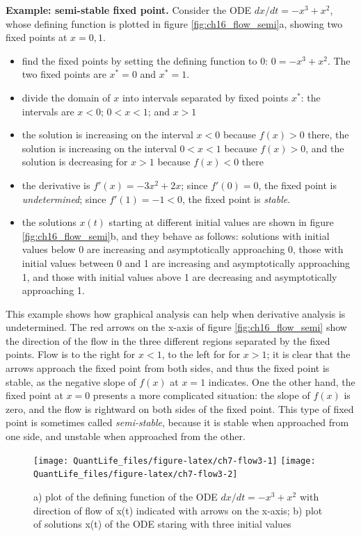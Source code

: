 \documentclass[
]{book}
\theoremstyle{definition}
\theoremstyle{definition}
\theoremstyle{definition}
\theoremstyle{remark}
\begin{document}
\textbf{Example: semi-stable fixed point.} Consider the ODE \(dx/dt = -x^3 + x^2\), whose defining function is plotted in figure \ref{fig:ch16_flow_semi}a, showing two fixed points at \(x = 0, 1\).

\begin{itemize}
\item
  find the fixed points by setting the defining function to 0: \(0 = -x^3 + x^2\). The two fixed points are \(x^*=0\) and \(x^*=1\).
\item
  divide the domain of \(x\) into intervals separated by fixed points \(x^*\): the intervals are \(x<0\); \(0<x<1\); and \(x>1\)
\item
  the solution is increasing on the interval \(x<0\) because \(f(x)>0\) there, the solution is increasing on the interval \(0<x<1\) because \(f(x)>0\), and the solution is decreasing for \(x>1\) because \(f(x)<0\) there
\item
  the derivative is \(f'(x)=-3x^2+2x\); since \(f'(0)=0\), the fixed point is \emph{undetermined}; since \(f'(1)=-1<0\), the fixed point is \emph{stable}.
\item
  the solutions \(x(t)\) starting at different initial values are shown in figure \ref{fig:ch16_flow_semi}b, and they behave as follows: solutions with initial values below 0 are increasing and asymptotically approaching 0, those with initial values between 0 and 1 are increasing and asymptotically approaching 1, and those with initial values above 1 are decreasing and asymptotically approaching 1.
\end{itemize}

This example shows how graphical analysis can help when derivative analysis is undetermined. The red arrows on the x-axis of figure \ref{fig:ch16_flow_semi} show the direction of the flow in the three different regions separated by the fixed points. Flow is to the right for \(x<1\), to the left for for \(x>1\); it is clear that the arrows approach the fixed point from both sides, and thus the fixed point is stable, as the negative slope of \(f(x)\) at \(x=1\) indicates. One the other hand, the fixed point at \(x=0\) presents a more complicated situation: the slope of \(f(x)\) is zero, and the flow is rightward on both sides of the fixed point. This type of fixed point is sometimes called \emph{semi-stable}, because it is stable when approached from one side, and unstable when approached from the other.

\begin{figure}

{\centering \texttt{[image: QuantLife\_files/figure-latex/ch7-flow3-1]} \texttt{[image: QuantLife\_files/figure-latex/ch7-flow3-2]} 

}

\caption{a) plot of the defining function of the ODE $dx/dt = -x^3 + x^2$ with direction of flow of x(t) indicated with arrows on the x-axis; b) plot of solutions x(t) of the ODE staring with three initial values}\label{fig:ch7-flow3}
\end{figure}
\end{document}
